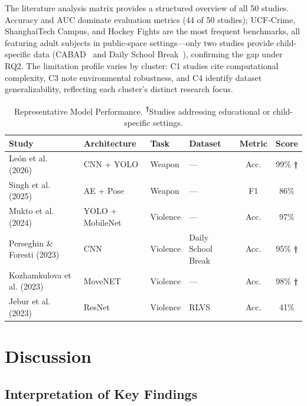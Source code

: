 \documentclass[conference]{IEEEtran}
\begin{document}
The literature analysis matrix provides a structured overview of all 50 studies. Accuracy and AUC dominate evaluation metrics (44 of 50 studies); UCF-Crime, ShanghaiTech Campus, and Hockey Fights are the most frequent benchmarks, all featuring adult subjects in public-space settings---only two studies provide child-specific data (CABAD~\cite{b15} and Daily School Break~\cite{b11}), confirming the gap under RQ2. The limitation profile varies by cluster: C1 studies cite computational complexity, C3 note environmental robustness, and C4 identify dataset generalizability, reflecting each cluster's distinct research focus.

\begin{table}[t]
\caption{Representative Model Performance. \textsuperscript{\textbf{†}}Studies addressing educational or child-specific settings.}
\begin{center}
\scriptsize
\setlength{\tabcolsep}{2pt}
\renewcommand{\arraystretch}{1.1}
\begin{tabular}{|p{2.1cm}|p{2.0cm}|p{1.0cm}|p{1.8cm}|c|c|}
\hline
\textbf{Study} & \textbf{Architecture} & \textbf{Task} & \textbf{Dataset} & \textbf{Metric} & \textbf{Score} \\
\hline
Le\'{o}n et al. (2026)~\cite{b1} & CNN + YOLO & Weapon & — & Acc. & 99\% \textbf{†} \\
\hline
Singh et al. (2025)~\cite{b6} & AE + Pose & Weapon & — & F1 & 86\% \\
\hline
Mukto et al. (2024)~\cite{b3} & YOLO + MobileNet & Violence & — & Acc. & 97\% \\
\hline
Perseghin \& Foresti (2023)~\cite{b11} & CNN & Violence & Daily School Break & Acc. & 95\% \textbf{†} \\
\hline
Kozhamkulova et al. (2023)~\cite{b2} & MoveNET & Violence & — & Acc. & 98\% \textbf{†} \\
\hline
Jebur et al. (2023)~\cite{b18} & ResNet & Violence & RLVS & Acc. & 41\% \\
\hline
\end{tabular}
\label{tab:model-performance}
\end{center}
\end{table}

\section{Discussion}

\subsection{Interpretation of Key Findings}
\end{document}
